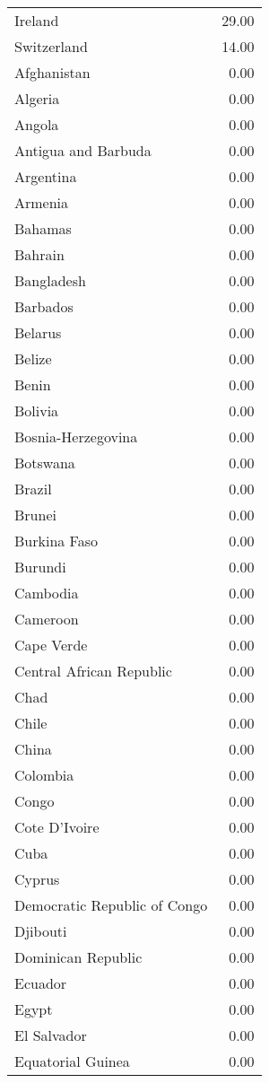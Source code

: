 \begin{table}[ht]
\begin{tabular}{lr}
  Ireland & 29.00 \\ 
  Switzerland & 14.00 \\ 
  Afghanistan & 0.00 \\ 
  Algeria & 0.00 \\ 
  Angola & 0.00 \\ 
  Antigua and Barbuda & 0.00 \\ 
  Argentina & 0.00 \\ 
  Armenia & 0.00 \\ 
  Bahamas & 0.00 \\ 
  Bahrain & 0.00 \\ 
  Bangladesh & 0.00 \\ 
  Barbados & 0.00 \\ 
  Belarus & 0.00 \\ 
  Belize & 0.00 \\ 
  Benin & 0.00 \\ 
  Bolivia & 0.00 \\ 
  Bosnia-Herzegovina & 0.00 \\ 
  Botswana & 0.00 \\ 
  Brazil & 0.00 \\ 
  Brunei & 0.00 \\ 
  Burkina Faso & 0.00 \\ 
  Burundi & 0.00 \\ 
  Cambodia & 0.00 \\ 
  Cameroon & 0.00 \\ 
  Cape Verde & 0.00 \\ 
  Central African Republic & 0.00 \\ 
  Chad & 0.00 \\ 
  Chile & 0.00 \\ 
  China & 0.00 \\ 
  Colombia & 0.00 \\ 
  Congo & 0.00 \\ 
  Cote D'Ivoire & 0.00 \\ 
  Cuba & 0.00 \\ 
  Cyprus & 0.00 \\ 
  Democratic Republic of Congo & 0.00 \\ 
  Djibouti & 0.00 \\ 
  Dominican Republic & 0.00 \\ 
  Ecuador & 0.00 \\ 
  Egypt & 0.00 \\ 
  El Salvador & 0.00 \\ 
  Equatorial Guinea & 0.00 \\ 

\end{tabular}
\end{table}
